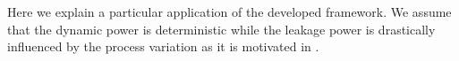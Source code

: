Here we explain a particular application of the developed framework. We assume that the dynamic power is deterministic while the leakage power is drastically influenced by the process variation as it is motivated in .
